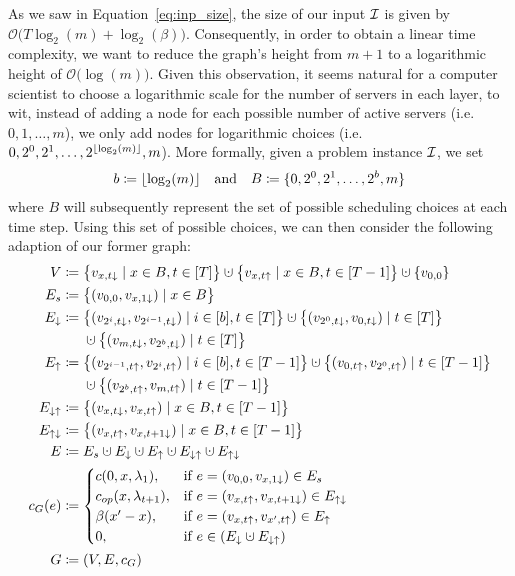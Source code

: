 As we saw in Equation~\eqref{eq:inp_size}, the size of our input $\mathcal{I}$ is given by $\mathcal{O}\bigl(T\log_2(m)+\log_2(\beta)\bigr)$. Consequently, in order to obtain a linear time complexity, we want to reduce the graph's height from $m+1$ to a logarithmic height of $\mathcal{O}\bigl(\log(m)\bigr)$. Given this observation, it seems natural for a computer scientist to choose a logarithmic scale for the number of servers in each layer, to wit, instead of adding a node for each possible number of active servers (i.e.\ $0,1,\dotsc,m$), we only add nodes for logarithmic choices (i.e.\ $0,2^0,2^1,\dotsc,2^{\lfloor\log_2(m)\rfloor},m$). More formally, given a problem instance $\mathcal{I}$, we set
\begin{align*}
	b\coloneqq\lfloor\log_2(m)\rfloor&&\text{and}&&B\coloneqq\{0,2^0,2^1,\dotsc,2^b,m\}
\end{align*}
where $B$ will subsequently represent the set of possible scheduling choices at each time step. Using this set of possible choices, we can then consider the following adaption of our former graph:
\begin{align*}
	V&\coloneqq\bigl\{v_{x,t\downarrow}\mid x\in B,t\in[T]\bigr\}\dotcup\bigl\{v_{x,t\uparrow}\mid x\in B, t\in[T-1]\bigr\}\dotcup\{v_{0,0}\}\\
	E_s&\coloneqq\bigl\{(v_{0,0},v_{x,1\downarrow})\mid x\in B\bigr\}\\
	E_\downarrow&\coloneqq\bigl\{(v_{2^i,t\downarrow},v_{2^{i-1},t\downarrow})\mid i\in[b],t\in[T]\bigr\}\dotcup\bigl\{(v_{2^0,t\downarrow},v_{0,t\downarrow})\mid t\in[T]\bigr\}\\
	&\phantom{{}\coloneqq{}}\dotcup\bigl\{(v_{m,t\downarrow},v_{2^b,t\downarrow})\mid t\in[T]\bigr\}\\
	E_\uparrow&\coloneqq\bigl\{(v_{2^{i-1},t\uparrow},v_{2^i,t\uparrow})\mid i\in[b],t\in[T-1]\bigr\}\dotcup\bigl\{(v_{0,t\uparrow},v_{2^0,t\uparrow})\mid t\in[T-1]\bigr\}\\
	&\phantom{{}\coloneqq{}}\dotcup\bigl\{(v_{2^b,t\uparrow},v_{m,t\uparrow})\mid t\in[T-1]\bigr\}\\
	E_{\downarrow\uparrow}&\coloneqq\bigl\{(v_{x,t\downarrow},v_{x,t\uparrow})\mid x\in B,t\in[T-1]\bigr\}\\
	E_{\uparrow\downarrow}&\coloneqq\bigl\{(v_{x,t\uparrow},v_{x,t+1\downarrow})\mid x\in B,t\in[T-1]\bigr\}\\
	E&\coloneqq E_s\dotcup E_\downarrow\dotcup E_\uparrow\dotcup E_{\downarrow\uparrow}\dotcup E_{\uparrow\downarrow}\\
	c_G(e)&\coloneqq
	\begin{cases}
		\costs(0,x,\lambda_1), & \text{if $e=(v_{0,0},v_{x,1\downarrow})\in E_s$}\\
		\opcosts(x,\lambda_{t+1}), & \text{if $e=(v_{x,t\uparrow},v_{x,t+1\downarrow})\in E_{\uparrow\downarrow}$}\\
		\beta(x'-x), & \text{if $e=(v_{x,t\uparrow},v_{x',t\uparrow})\in E_\uparrow$}\\
		0, & \text{if $e\in(E_\downarrow\dotcup E_{\downarrow\uparrow})$}
	\end{cases}\\
	G&\coloneqq(V,E,c_G)
\end{align*}
